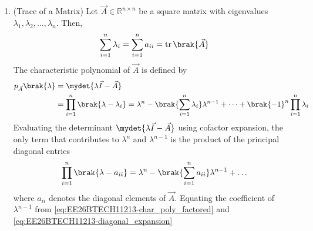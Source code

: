 \begin{enumerate}[label=\thesubsection.\arabic*, ref=\thesubsection.\theenumi,itemsep=0pt]
\begin{itemize}
\item Standard Inverse Transform Pair:
For any scalar constant $\alpha$:
\begin{align}
\mathcal{Z}^{-1}\brak{\frac{1}{1 - \alpha z^{-1}}} = \alpha^n u\brak{n}, \quad \abs{z} > \abs{\alpha} \label{eq:EE26BTECH11213-z_inv_exponential}
\end{align}
\end{itemize}
%
\item (Trace of a Matrix)
Let $\vec{A} \in \mathbb{R}^{n \times n}$ be a square matrix with eigenvalues $\lambda_1, \lambda_2, \dots, \lambda_n$.  Then,
\begin{align}
\sum_{i=1}^n \lambda_i = \sum_{i=1}^n a_{ii} = \operatorname{tr}\brak{\vec{A}} \label{eq:EE26BTECH11213-sum_eigenvalues_trace}
\end{align}
\solution
 The characteristic polynomial of $\vec{A}$ is defined by
\begin{align}
	p_{\vec{A}}\brak{\lambda} &= \mydet{\lambda \vec{I} - \vec{A}} \label{eq:EE26BTECH11213-char_poly_det}
	\\
 &= \prod_{i=1}^n \brak{\lambda - \lambda_i} = \lambda^n - \brak{\sum_{i=1}^n \lambda_i} \lambda^{n-1} + \dots + \brak{-1}^n \prod_{i=1}^n \lambda_i \label{eq:EE26BTECH11213-char_poly_factored}
\end{align}
Evaluating the determinant $\mydet{\lambda \vec{I} - \vec{A}}$ using cofactor expansion, the only term that contributes to $\lambda^n$ and $\lambda^{n-1}$ is the product of the principal diagonal entries
\begin{align}
\prod_{i=1}^n \brak{\lambda - a_{ii}} = \lambda^n - \brak{\sum_{i=1}^n a_{ii}} \lambda^{n-1} + \dots \label{eq:EE26BTECH11213-diagonal_expansion}
\end{align}
where $a_{ii}$ denotes the diagonal elements of $\vec{A}$.
Equating the coefficient of $\lambda^{n-1}$ from \eqref{eq:EE26BTECH11213-char_poly_factored} and \eqref{eq:EE26BTECH11213-diagonal_expansion}
\end{enumerate}
